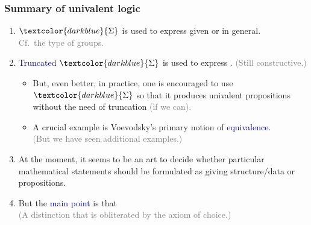 \documentclass[aspectratio=169]{beamer}
\newcommand{\db}{\textcolor{darkblue}}
\newcommand{\grey}{\textcolor{grey}}
\newcommand{\m}[1]{$\db{#1}$}
\begin{document}
\begin{frame}
  \frametitle{Summary of univalent logic}

  \begin{enumerate}
  \vfill \item \m{\Sigma} is used to express given  or  in general. \\[1ex]
\grey{Cf.\ the type of groups.}

  \vfill \item \db{Truncated} \m{\Sigma} is used to express . \grey{(Still constructive.)}
    \begin{itemize}
    \vfill \item But, even better, in practice, one is encouraged to use \m{\Sigma} so that it produces univalent propositions without the need of truncation \grey{(if we can).}
\vfill \item
A crucial example is Voevodsky's primary notion of \db{equivalence}. \\[1ex]
\grey{(But we have seen additional examples.)}
    \end{itemize}
\vfill \item At the moment, it seems to be an art to decide whether  particular mathematical statements should be formulated as giving structure/data or propositions. 
\vfill \item But the \db{main point} is that  \\[1ex]

\grey{(A distinction that is obliterated by the axiom of choice.)}

  \end{enumerate}

\end{frame}
\end{document}
